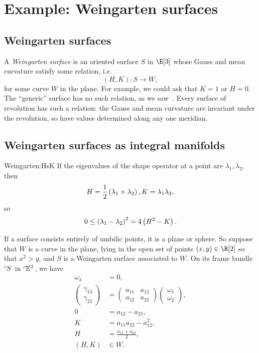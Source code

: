 \chapter{Example: Weingarten surfaces}\label{chapter:Weingarten}
\section{Weingarten surfaces}
A \emph{Weingarten surface} is an oriented surface \(S\) in \(\E[3]\) whose Gauss and mean curvature satisfy some relation, i.e.
\[
(H,K) \colon S \to W,
\]
for some curve \(W\) in the plane.
For example, we could ask that \(K=1\) or \(H=0\).
The ``generic'' surface has no such relation, as we saw~.
Every surface of revolution has such a relation: the Gauss and mean curvature are invariant under the revolution, so have values determined along any one meridian.
\section{Weingarten surfaces as integral manifolds}
\begin{answer}{Weingarten:HsK}
If the eigenvalues of the shape operator at a point are \(\lambda_1, \lambda_2\), then
\[
H=\frac{1}{2}\left(\lambda_1+\lambda_2\right), K=\lambda_1\lambda_2,
\]
so
\[
0 \le \left(\lambda_1-\lambda_2\right)^2=4\left(H^2-K\right).
\]
\end{answer}
If a surface consists entirely of umbilic points, it is a plane or sphere.
So suppose that \(W\) is a curve in the plane, lying in the open set of points \((x,y) \in \R[2]\) so that \(x^2>y\), and \(S\) is a Weingarten surface associated to \(W\).
On its frame bundle \(\left\ulcorner\!S\right.\) in \(\left\ulcorner\!\mathbb{E}^{3}\right.\), we have
\begin{align*}
\omega_3 &= 0, \\
\begin{pmatrix}
\gamma_{13}\\
\gamma_{23}
\end{pmatrix}
&= 
\begin{pmatrix}
a_{11}&a_{12}\\
a_{12}&a_{22}
\end{pmatrix}
\begin{pmatrix}
\omega_1\\
\omega_2
\end{pmatrix},
\\
0 &= a_{12} - a_{21}, \\
K &= a_{11} a_{22} - a_{12}^2, \\
H &= \frac{a_{11}+a_{22}}{2}, \\
(H,K) &\in W.
\end{align*}

